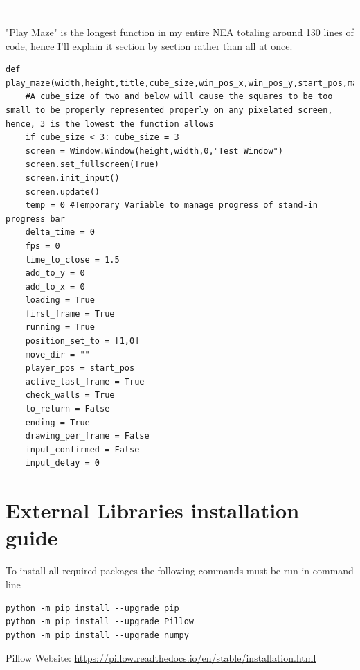 \documentclass{article}
\begin{document}
\textcolor[RGB]{220,220,220}{\rule{\linewidth}{0.2pt}}
\begin{lstlisting}
\end{lstlisting}
"Play Maze" is the longest function in my entire NEA totaling around 130 lines of code, hence I'll explain it section by section rather than all at once.
\begin{lstlisting}
def play_maze(width,height,title,cube_size,win_pos_x,win_pos_y,start_pos,maze_data):
    #A cube_size of two and below will cause the squares to be too small to be properly represented properly on any pixelated screen, hence, 3 is the lowest the function allows
    if cube_size < 3: cube_size = 3 
    screen = Window.Window(height,width,0,"Test Window")
    screen.set_fullscreen(True)
    screen.init_input()
    screen.update()
    temp = 0 #Temporary Variable to manage progress of stand-in progress bar
    delta_time = 0
    fps = 0
    time_to_close = 1.5
    add_to_y = 0
    add_to_x = 0
    loading = True
    first_frame = True
    running = True
    position_set_to = [1,0]
    move_dir = ""
    player_pos = start_pos
    active_last_frame = True
    check_walls = True
    to_return = False
    ending = True
    drawing_per_frame = False
    input_confirmed = False
    input_delay = 0
\end{lstlisting}



\clearpage
\section{External Libraries installation guide}
To install all required packages the following commands must be run in command line                      
\begin{lstlisting}
python -m pip install --upgrade pip
python -m pip install --upgrade Pillow
python -m pip install --upgrade numpy
\end{lstlisting}
Pillow Website: \url{https://pillow.readthedocs.io/en/stable/installation.html}
\end{document}
